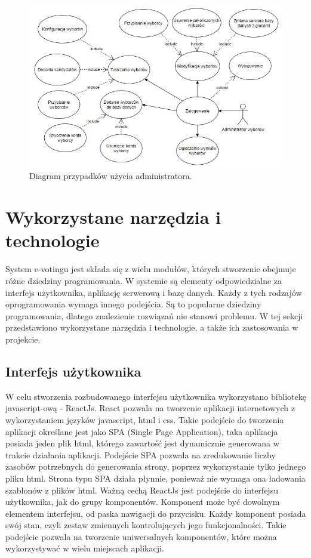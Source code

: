 \documentclass[a4paper,12pt]{book}
\begin{document}
\begin{figure}[h]
	\centering
	\includegraphics[width=\textwidth]{images/admin_use_case.jpg}
	\caption{Diagram przypadków użycia administratora.}
\end {figure}

\newpage
\section {Wykorzystane narzędzia i technologie}

System e-votingu jest składa się z wielu modułów, których stworzenie obejmuje różne dziedziny programowania. W systemie są elementy odpowiedzialne za interfejs użytkownika, aplikację serwerową i bazę danych. Każdy z tych rodzajów oprogramowania wymaga innego podejścia. Są to popularne dziedziny programowania, dlatego znalezienie rozwiązań nie stanowi problemu. W tej sekcji przedstawiono wykorzystane narzędzia i technologie, a także ich zastosowania w projekcie.

\subsection{Interfejs użytkownika}

W celu stworzenia rozbudowanego interfejsu użytkownika wykorzystano bibliotekę javascript-ową - ReactJs. React pozwala na tworzenie aplikacji internetowych z wykorzystaniem języków javascript, html i css. Takie podejście do tworzenia aplikacji określane jest jako SPA (Single Page Application), taka aplikacja posiada jeden plik html, którego zawartość jest dynamicznie generowana w trakcie działania aplikacji. Podejście SPA pozwala na zredukowanie liczby zasobów potrzebnych do generowania strony, poprzez wykorzystanie tylko jednego pliku html. Strona typu SPA działa płynnie, ponieważ nie wymaga ona ładowania szablonów z plików html. Ważną cechą ReactJs jest podejście do interfejsu użytkownika, jak do grupy komponentów. Komponent może być dowolnym elementem interfejsu, od paska nawigacji do przycisku. Każdy komponent posiada swój stan, czyli zestaw zmiennych kontrolujących jego funkcjonalności. Takie podejście pozwala na tworzenie uniwersalnych komponentów, które można wykorzystywać w wielu miejscach aplikacji.
\end{document}
